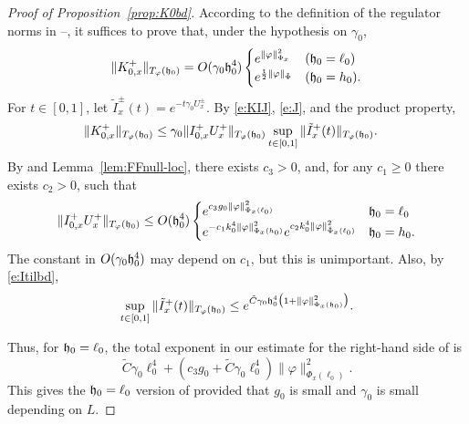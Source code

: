 \begin{proof}[Proof of Proposition~\ref{prop:K0bd}]
According to the definition of the
regulator norms in --,
it suffices to prove that, under the hypothesis on $\gamma_0$,
\begin{equation}
\label{e:K0bd}
  \|K^+_{0,x}\|_{T_\varphi(\mathfrak{h}_0)} = O(\gamma_0 \mathfrak{h}_0^4)
  \begin{cases}
  e^{\|\varphi\|_{\Phi_x}^2} & (\mathfrak{h}_0=\ell_0)
  \\
  e^{\frac{{\sf t}}{2} \|\varphi\|_{\tilde\Phi}} & (\mathfrak{h}_0=h_0).
  \end{cases}
\end{equation}
For $t \in [0,1]$, let $\tilde I^\pm_x(t) = e^{-t \gamma_0 U^\pm_x}$.
By \eqref{e:KIJ}, \eqref{e:J}, and the product property,
\begin{align}
\label{e:K0x-est}
    \|K^+_{0,x}\|_{T_\varphi(\mathfrak{h}_0)}
    & \le \gamma_0 \|I^+_{0,x} U^+_x\|_{T_\varphi(\mathfrak{h}_0)}
    \sup_{t\in [0, 1]} \|\tilde I^+_{x}(t)\|_{T_\varphi(\mathfrak{h}_0)}.
\end{align}
By  and Lemma~\ref{lem:FFnull-loc},
there exists $c_3 > 0$, and, for any $c_1 \geq 0$ there exists $c_2 > 0$, such that
\begin{equation}
\label{e:Iupper-bis}
\|I^+_{0,x} U^+_x\|_{T_\varphi(\mathfrak{h}_0)}
  \leq
O(\mathfrak{h}_0^4)
\begin{cases}
  e^{c_3 g_0  \|\varphi\|^2_{\Phi_x(\ell_0)}}
    & \mathfrak{h}_0 = \ell_0 \\
  e^{-c_1 k_0^4 \|\varphi\|^2_{\Phi_x(h_0)}} e^{c_2 k_0^4 \|\varphi\|^2_{\tilde\Phi_x(\ell_0)}}
    & \mathfrak{h}_0 = h_0.
\end{cases}
\end{equation}
The constant in $O(\gamma_0 \mathfrak{h}_0^4)$ may depend on $c_1$,
but this is unimportant.
Also, by \eqref{e:Itilbd},
\begin{equation}
\sup_{t\in[0,1]} \|\tilde I_{x}^+(t) \|_{T_\varphi(\mathfrak{h}_0)}
  \le
e^{\tilde C \gamma_0 \mathfrak{h}_0^4 \big(1+\|\varphi\|^2_{\Phi_x(\mathfrak{h}_0)}\big)}.
\end{equation}

Thus, for $\mathfrak{h}_0=\ell_0$,
the total exponent in our estimate for the right-hand side of 
is
\begin{equation}
    \tilde C \gamma_0 \ell_0^4
       +(c_3 g_0 + \tilde C \gamma_0 \ell_0^4) \|\varphi\|^2_{\Phi_x(\ell_0)}
     .
\end{equation}
This gives the $\mathfrak{h}_0=\ell_0$ version of  provided that
$g_0$ is small and $\gamma_0$ is small depending on $L$.


\end{proof}
